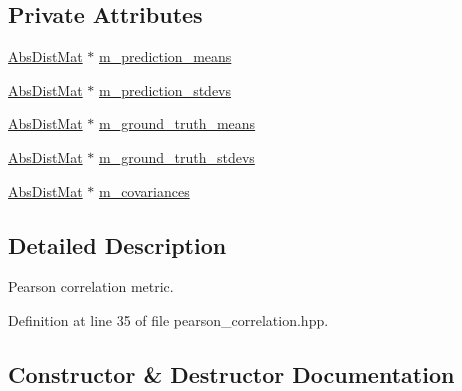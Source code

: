\subsection*{Private Attributes}
\begin{DoxyCompactItemize}
\item 
\hyperlink{base_8hpp_a9a697a504ae84010e7439ffec862b470}{Abs\+Dist\+Mat} $\ast$ \hyperlink{classlbann_1_1pearson__correlation__metric_ac664eebee2c3d3287848c570400bdddb}{m\+\_\+prediction\+\_\+means}
\item 
\hyperlink{base_8hpp_a9a697a504ae84010e7439ffec862b470}{Abs\+Dist\+Mat} $\ast$ \hyperlink{classlbann_1_1pearson__correlation__metric_ad288c4206078866feb39a4f982d8e975}{m\+\_\+prediction\+\_\+stdevs}
\item 
\hyperlink{base_8hpp_a9a697a504ae84010e7439ffec862b470}{Abs\+Dist\+Mat} $\ast$ \hyperlink{classlbann_1_1pearson__correlation__metric_aa67f395597bf6bbf9bd57645877f26a5}{m\+\_\+ground\+\_\+truth\+\_\+means}
\item 
\hyperlink{base_8hpp_a9a697a504ae84010e7439ffec862b470}{Abs\+Dist\+Mat} $\ast$ \hyperlink{classlbann_1_1pearson__correlation__metric_a7ed5e7a1778d17f852f4277afcaa31ed}{m\+\_\+ground\+\_\+truth\+\_\+stdevs}
\item 
\hyperlink{base_8hpp_a9a697a504ae84010e7439ffec862b470}{Abs\+Dist\+Mat} $\ast$ \hyperlink{classlbann_1_1pearson__correlation__metric_aeabb941e22f2718a59103b7ec98a9c1e}{m\+\_\+covariances}
\end{DoxyCompactItemize}


\subsection{Detailed Description}
Pearson correlation metric. 

Definition at line 35 of file pearson\+\_\+correlation.\+hpp.



\subsection{Constructor \& Destructor Documentation}
\mbox{\label{classlbann_1_1pearson__correlation__metric_ac0d93a18b2eb500db51f40311a3b3634}} 
